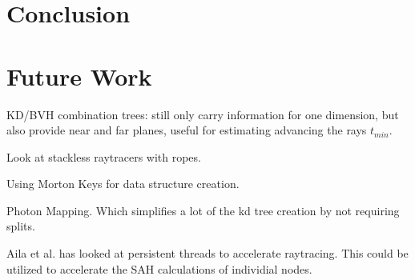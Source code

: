 







\chapter{Conclusion}


\chapter{Future Work}\label{chp:future}


KD/BVH combination trees: still only carry information for one
dimension, but also provide near and far planes, useful for estimating
advancing the rays $t_{min}$.

Look at stackless raytracers with ropes.

Using Morton Keys for data structure creation.

Photon Mapping. Which simplifies a lot of the kd tree creation by not
requiring splits.

Aila et al. has looked at persistent threads to
accelerate raytracing. This could be utilized to accelerate the SAH
calculations of individial nodes.

